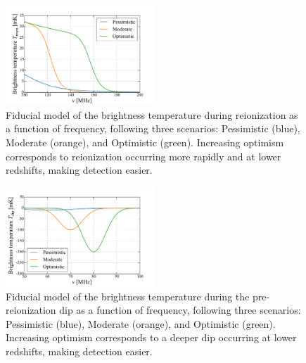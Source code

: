 \documentclass[twocolumn,apj,numberedappendix]{emulateapj}
\begin{document}
\begin{figure}[h]
	\centering
	\includegraphics[width=0.5\textwidth]{figures/reionScenarios.pdf}
	\caption{Fiducial model of the brightness temperature during reionization as a function of frequency, following three scenarios: Pessimistic (blue), Moderate (orange), and Optimistic (green). Increasing optimism corresponds to reionization occurring more rapidly and at lower redshifts, making detection easier.}
	\label{fig:reionScenarios}
\end{figure}


\begin{figure}[h]
	\centering
	\includegraphics[width=0.5\textwidth]{figures/dipScenarios.pdf}
	\caption{Fiducial model of the brightness temperature during the pre-reionization dip as a function of frequency, following three scenarios: Pessimistic (blue), Moderate (orange), and Optimistic (green). Increasing optimism corresponds to a deeper dip occurring at lower redshifts, making detection easier.}
	\label{fig:dipScenarios}
\end{figure}
\end{document}
